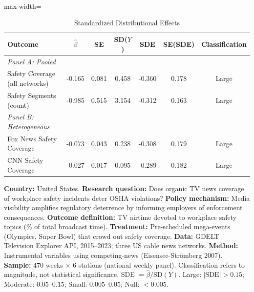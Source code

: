 \begin{table}[htbp]
\centering
\caption{Standardized Distributional Effects}
\label{tab:sde}
\begin{adjustbox}{max width=\textwidth}
\begin{tabular}{lcccccc}
\hline\hline
Outcome & $\hat{\beta}$ & SE & SD($Y$) & SDE & SE(SDE) & Classification \\
\hline
\emph{Panel A: Pooled} & & & & & & \\
Safety Coverage (all networks) & -0.165 & 0.081 & 0.458 & -0.360 & 0.178 & Large \\
Safety Segments (count) & -0.985 & 0.515 & 3.154 & -0.312 & 0.163 & Large \\
[0.5em]
\emph{Panel B: Heterogeneous} & & & & & & \\
Fox News Safety Coverage & -0.073 & 0.043 & 0.238 & -0.308 & 0.179 & Large \\
CNN Safety Coverage & -0.027 & 0.017 & 0.095 & -0.289 & 0.182 & Large \\
\hline\hline
\end{tabular}
\end{adjustbox}
\begin{flushleft}\small
\textbf{Country:} United States.
\textbf{Research question:} Does organic TV news coverage of workplace safety incidents deter OSHA violations?
\textbf{Policy mechanism:} Media visibility amplifies regulatory deterrence by informing employers of enforcement consequences.
\textbf{Outcome definition:} TV airtime devoted to workplace safety topics (\% of total broadcast time).
\textbf{Treatment:} Pre-scheduled mega-events (Olympics, Super Bowl) that crowd out safety coverage.
\textbf{Data:} GDELT Television Explorer API, 2015--2023; three US cable news networks.
\textbf{Method:} Instrumental variables using competing-news (Eisensee-Str\"omberg 2007).
\textbf{Sample:} 470 weeks $\times$ 6 stations (national weekly panel).
Classification refers to magnitude, not statistical significance. SDE $= \hat{\beta} / \text{SD}(Y)$. Large: $|\text{SDE}| > 0.15$; Moderate: $0.05$--$0.15$; Small: $0.005$--$0.05$; Null: $< 0.005$.
\end{flushleft}
\end{table}

